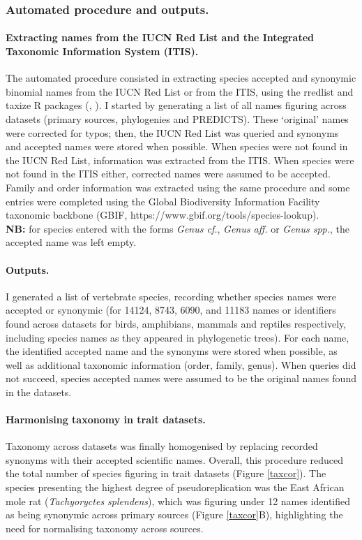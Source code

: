 \subsubsection{Automated procedure and outputs.}
\paragraph{Extracting names from the IUCN Red List and the Integrated Taxonomic Information System (ITIS).}
The automated procedure consisted in extracting species accepted and synonymic binomial names from the IUCN Red List or from the ITIS, using the rredlist and taxize R packages (\cite{rredlist}, \cite{Chamberlain2013}). I started by generating a list of all names figuring across datasets (primary sources, phylogenies and PREDICTS). These `original' names were corrected for typos; then, the IUCN Red List was queried and synonyms and accepted names were stored when possible. When species were not found in the IUCN Red List, information was extracted from the ITIS. When species were not found in the ITIS either, corrected names were assumed to be accepted. Family and order information was extracted using the same procedure and some entries were completed using the Global Biodiversity Information Facility taxonomic backbone (GBIF, https://www.gbif.org/tools/species-lookup).\\
\textbf{NB:} for species entered with the forms \textit{Genus cf.}, \textit{Genus aff.} or \textit{Genus spp.}, the accepted name was left empty.

\paragraph{Outputs.} I generated a list of vertebrate species, recording whether species names were accepted or synonymic (for 14124, 8743, 6090, and 11183 names or identifiers found across datasets for birds, amphibians, mammals and reptiles respectively, including species names as they appeared in phylogenetic trees). For each name, the identified accepted name and the synonyms were stored when possible, as well as additional taxonomic information (order, family, genus). When queries did not succeed, species accepted names were assumed to be the original names found in the datasets.

\paragraph{Harmonising taxonomy in trait datasets.}
Taxonomy across datasets was finally homogenised by replacing recorded synonyms with their accepted scientific names. Overall, this procedure  reduced the total number of species figuring in trait datasets (Figure \ref{taxcor}). The species presenting the highest degree of pseudoreplication was the East African mole rat (\textit{Tachyoryctes splendens}), which was figuring under 12 names identified as being synonymic across primary sources (Figure \ref{taxcor}B), highlighting the need for normalising taxonomy across sources.

